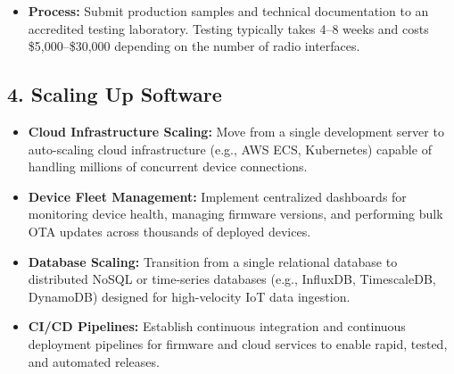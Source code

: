 \begin{itemize}
  \item   \textbf{Process:} Submit production samples and technical documentation to an accredited testing laboratory. Testing typically takes 4–8 weeks and costs \$5,000–\$30,000 depending on the number of radio interfaces.
\end{itemize}


\subsection{4. Scaling Up Software}
\begin{itemize}
  \item   \textbf{Cloud Infrastructure Scaling:} Move from a single development server to auto-scaling cloud infrastructure (e.g., AWS ECS, Kubernetes) capable of handling millions of concurrent device connections.
  \item   \textbf{Device Fleet Management:} Implement centralized dashboards for monitoring device health, managing firmware versions, and performing bulk OTA updates across thousands of deployed devices.
  \item   \textbf{Database Scaling:} Transition from a single relational database to distributed NoSQL or time-series databases (e.g., InfluxDB, TimescaleDB, DynamoDB) designed for high-velocity IoT data ingestion.
  \item   \textbf{CI/CD Pipelines:} Establish continuous integration and continuous deployment pipelines for firmware and cloud services to enable rapid, tested, and automated releases.
\end{itemize}
